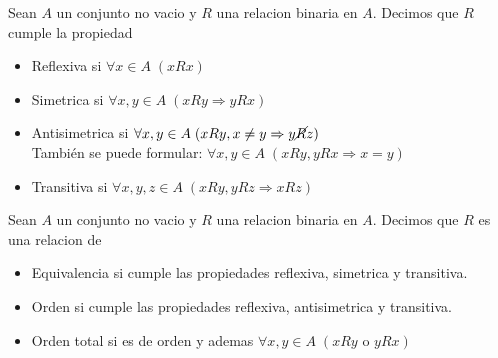 \begin{definition}
	Sean \(A \) un conjunto no vacio y \(R \) una relacion binaria en \(A \). Decimos que \(R \) cumple la propiedad
	\begin{itemize}
		\item Reflexiva si \(\forall x \in  A \;(xRx )\)
		\item Simetrica si \(\forall x,y \in  A \;(xRy \Rightarrow yRx )\)
		\item Antisimetrica si \(\forall  x,y \in A \;(xRy, x \neq y \Rightarrow y \cancel R z)\) \\
		      También se puede formular: \(\forall x,y \in  A \; (xRy, yRx \Rightarrow x = y)\)
		\item Transitiva si \(\forall x,y,z \in A \; (xRy, yRz \Rightarrow xRz)\)
	\end{itemize}
\end{definition}

\begin{definition}
	Sean \(A \) un conjunto no vacio y \(R \) una relacion binaria en \(A \). Decimos que \(R \) es una relacion de
	\begin{itemize}
		\item Equivalencia si cumple las propiedades reflexiva, simetrica y transitiva.
		\item Orden si cumple las propiedades reflexiva, antisimetrica y transitiva.
		\item Orden total si es de orden y ademas \(\forall x,y \in A \; (xRy \text{ o } yRx )\)
	\end{itemize}
\end{definition}

